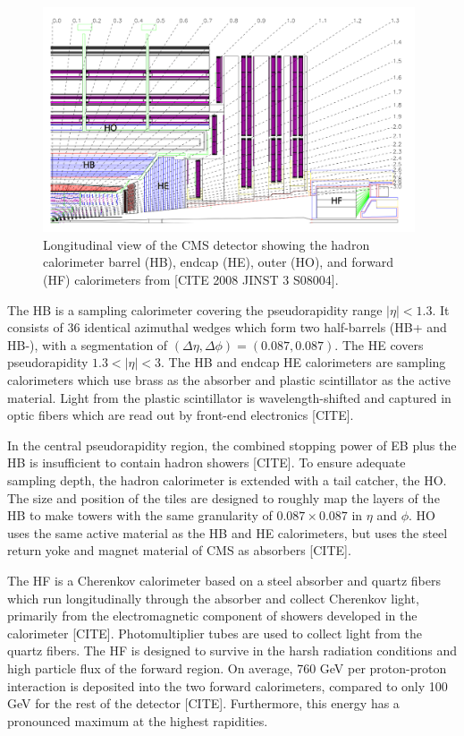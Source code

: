 \begin{figure}[ht]
    \centering
    \includegraphics[width=11cm]{figures/ch-2-cern-cms/phase-1-HCAL-schematic.png}
    \caption{Longitudinal view of the CMS detector showing the hadron calorimeter barrel (HB), endcap (HE), outer (HO), and forward (HF) calorimeters from [CITE 2008 JINST 3 S08004].}
    \label{fig:phase-1-HCAL-schematic}
\end{figure}


The HB is a sampling calorimeter covering the pseudorapidity range $|\eta| < 1.3$. It consists of 36 identical azimuthal wedges which form two half-barrels (HB+ and HB-), with a segmentation of $(\Delta \eta, \Delta \phi) = (0.087, 0.087)$. The HE covers pseudorapidity $1.3 < |\eta| < 3$. The HB and endcap HE calorimeters are sampling calorimeters which use brass as the absorber and plastic scintillator as the active material. Light from the plastic scintillator is wavelength-shifted and captured in optic fibers which are read out by front-end electronics [CITE]. %

In the central pseudorapidity region, the combined stopping power of EB plus the HB is insufficient to contain hadron showers [CITE]. To ensure adequate sampling depth, the hadron calorimeter is extended with a tail catcher, the HO. The size and position of the tiles are designed to roughly map the layers of the HB to make towers with the same granularity of $0.087 \times 0.087$ in $\eta$ and $\phi$. HO uses the same active material as the HB and HE calorimeters, but uses the steel return yoke and magnet material of CMS as absorbers [CITE]. %

The HF is a Cherenkov calorimeter based on a steel absorber and quartz fibers which run longitudinally through the absorber and collect Cherenkov light, primarily from the electromagnetic component of showers developed in the calorimeter [CITE]. Photomultiplier tubes are used to  collect light from the quartz fibers. The HF is designed to survive in the harsh radiation conditions and high particle flux of the forward region. On average, 760 GeV per proton-proton interaction is deposited into the two forward calorimeters, compared to only 100 GeV for the rest of the detector [CITE]. Furthermore, this energy has a pronounced maximum at the highest rapidities.

